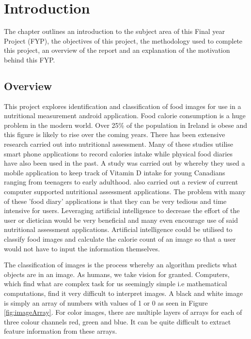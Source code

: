 \chapter{Introduction}
\label{intro}
The chapter outlines an introduction to the subject area of this Final year Project (FYP), the objectives of this project, the methodology used to complete this project, an overview of the report and an explanation of the motivation behind this FYP.

\section{Overview}
This project explores identification and classification of food images for use in a nutritional measurement android application.
Food calorie consumption is a huge problem in the modern world.
Over 25\% of the population in Ireland is obese and this figure is likely to rise over the coming years.
There has been extensive research carried out into nutritional assessment.
Many of these studies utilise smart phone applications to record calories intake while physical food diaries have also been used in the past.
A study was carried out by \textcite{goodman2015vitamin} whereby they used a mobile application to keep track of Vitamin D intake for young Canadians ranging from teenagers to early adulthood.
\textcite{arens2015promising} also carried out a review of current computer supported nutritional assessment applications.
The problem with many of these 'food diary' applications is that they can be very tedious and time intensive for users.
Leveraging artificial intelligence to decrease the effort of the user or dietician would be very beneficial and many even encourage use of said nutritional assessment applications.
Artificial intelligence could be utilised to classify food images and calculate the calorie count of an image so that a user would not have to input the information themselves.

The classification of images is the process whereby an algorithm predicts what objects are in an image.
As humans, we take vision for granted.
Computers, which find what are complex task for us seemingly simple i.e mathematical computations, find it very difficult to interpret images.
A black and white image is simply an array of numbers with values of 1 or 0 as seen in Figure \ref{fig:imageArray}. 
For color images, there are multiple layers of arrays for each of three colour channels red, green and blue.
It can be quite difficult to extract feature information from these arrays.

